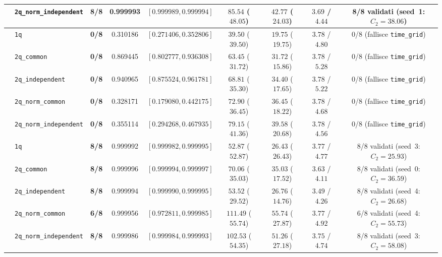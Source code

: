 \documentclass[11pt,a4paper]{article}
\begin{document}
\begin{table}[H]
{\begin{tabular}{llccccccc}
 & \texttt{2q\_norm\_independent} & \textbf{8/8} & 0.999993 & $[0.999989, 0.999994]$ & $85.54$ ($48.05$) & $42.77$ ($24.03$) & $3.69$ / $4.44$ & 8/8 validati (seed~1: $C_2=38.06$) \\
\midrule
{}
 & \texttt{1q} & \textbf{0/8} & 0.310186 & $[0.271406, 0.352806]$ & $39.50$ ($39.50$) & $19.75$ ($19.75$) & $3.78$ / $4.80$ & 0/8 (fallisce \texttt{time\_grid}) \\
 & \texttt{2q\_common} & \textbf{0/8} & 0.869445 & $[0.802777, 0.936308]$ & $63.45$ ($31.72$) & $31.72$ ($15.86$) & $3.78$ / $5.28$ & 0/8 (fallisce \texttt{time\_grid}) \\
 & \texttt{2q\_independent} & \textbf{0/8} & 0.940965 & $[0.875524, 0.961781]$ & $68.81$ ($35.30$) & $34.40$ ($17.65$) & $3.78$ / $5.22$ & 0/8 (fallisce \texttt{time\_grid}) \\
 & \texttt{2q\_norm\_common} & \textbf{0/8} & 0.328171 & $[0.179080, 0.442175]$ & $72.90$ ($36.45$) & $36.45$ ($18.22$) & $3.78$ / $4.68$ & 0/8 (fallisce \texttt{time\_grid}) \\
 & \texttt{2q\_norm\_independent} & \textbf{0/8} & 0.355114 & $[0.294268, 0.467935]$ & $79.15$ ($41.36$) & $39.58$ ($20.68$) & $3.78$ / $4.56$ & 0/8 (fallisce \texttt{time\_grid}) \\
\midrule
{}
 & \texttt{1q} & \textbf{8/8} & 0.999992 & $[0.999982, 0.999995]$ & $52.87$ ($52.87$) & $26.43$ ($26.43$) & $3.77$ / $4.77$ & 8/8 validati (seed~3: $C_2=25.93$) \\
 & \texttt{2q\_common} & \textbf{8/8} & 0.999996 & $[0.999994, 0.999997]$ & $70.06$ ($35.03$) & $35.03$ ($17.52$) & $3.63$ / $4.11$ & 8/8 validati (seed~0: $C_2=36.59$) \\
 & \texttt{2q\_independent} & \textbf{8/8} & 0.999994 & $[0.999990, 0.999995]$ & $53.52$ ($29.52$) & $26.76$ ($14.76$) & $3.49$ / $4.26$ & 8/8 validati (seed~4: $C_2=26.68$) \\
 & \texttt{2q\_norm\_common} & \textbf{6/8} & 0.999956 & $[0.972811, 0.999985]$ & $111.49$ ($55.74$) & $55.74$ ($27.87$) & $3.77$ / $4.92$ & 6/8 validati (seed~4: $C_2=55.73$) \\
 & \texttt{2q\_norm\_independent} & \textbf{8/8} & 0.999986 & $[0.999984, 0.999993]$ & $102.53$ ($54.35$) & $51.26$ ($27.18$) & $3.75$ / $4.74$ & 8/8 validati (seed~3: $C_2=58.08$) \\

\end{tabular}}
\end{table}
\end{document}
